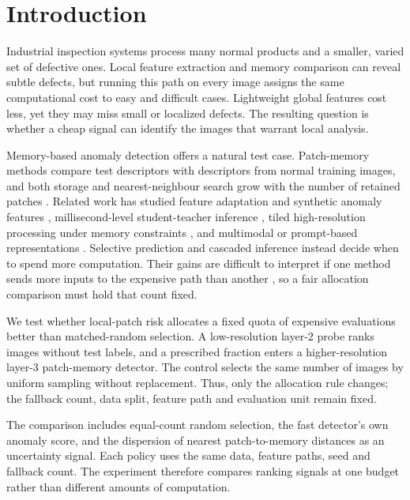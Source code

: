 \documentclass[iicol,pdflatex,sn-basic,Numbered]{sn-jnl}
\begin{document}
\section{Introduction}\label{sec:introduction}

Industrial inspection systems process many normal products and a smaller, varied set of defective ones. Local feature extraction and memory comparison can reveal subtle defects, but running this path on every image assigns the same computational cost to easy and difficult cases. Lightweight global features cost less, yet they may miss small or localized defects. The resulting question is whether a cheap signal can identify the images that warrant local analysis.

Memory-based anomaly detection offers a natural test case. Patch-memory methods compare test descriptors with descriptors from normal training images, and both storage and nearest-neighbour search grow with the number of retained patches \cite{bergmann2019mvtec,defard2021padim,roth2022patchcore}. Related work has studied feature adaptation and synthetic anomaly features \cite{liu2023simplenet}, millisecond-level student-teacher inference \cite{batzner2024efficientad}, tiled high-resolution processing under memory constraints \cite{rolih2024divide}, and multimodal or prompt-based representations \cite{jeong2023winclip,li2024promptad,li2024promptadzero,costanzino2024multimodal}. Selective prediction and cascaded inference instead decide when to spend more computation. Their gains are difficult to interpret if one method sends more inputs to the expensive path than another \cite{geifman2017selective}, so a fair allocation comparison must hold that count fixed.

We test whether local-patch risk allocates a fixed quota of expensive evaluations better than matched-random selection. A low-resolution layer-2 probe ranks images without test labels, and a prescribed fraction enters a higher-resolution layer-3 patch-memory detector. The control selects the same number of images by uniform sampling without replacement. Thus, only the allocation rule changes; the fallback count, data split, feature path and evaluation unit remain fixed.

The comparison includes equal-count random selection, the fast detector's own anomaly score, and the dispersion of nearest patch-to-memory distances as an uncertainty signal. Each policy uses the same data, feature paths, seed and fallback count. The experiment therefore compares ranking signals at one budget rather than different amounts of computation.
\end{document}
